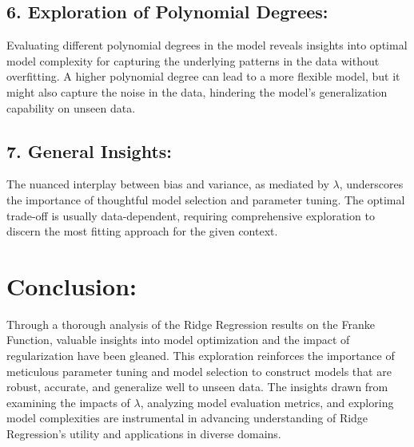 \documentclass{article}
\begin{document}
\subsection*{6. Exploration of Polynomial Degrees:}
Evaluating different polynomial degrees in the model reveals insights into optimal model complexity for capturing the underlying patterns in the data without overfitting. A higher polynomial degree can lead to a more flexible model, but it might also capture the noise in the data, hindering the model's generalization capability on unseen data.

\subsection*{7. General Insights:}
The nuanced interplay between bias and variance, as mediated by $\lambda$, underscores the importance of thoughtful model selection and parameter tuning. The optimal trade-off is usually data-dependent, requiring comprehensive exploration to discern the most fitting approach for the given context.

\section*{Conclusion:}
Through a thorough analysis of the Ridge Regression results on the Franke Function, valuable insights into model optimization and the impact of regularization have been gleaned. This exploration reinforces the importance of meticulous parameter tuning and model selection to construct models that are robust, accurate, and generalize well to unseen data. The insights drawn from examining the impacts of $\lambda$, analyzing model evaluation metrics, and exploring model complexities are instrumental in advancing understanding of Ridge Regression's utility and applications in diverse domains.
\end{document}

